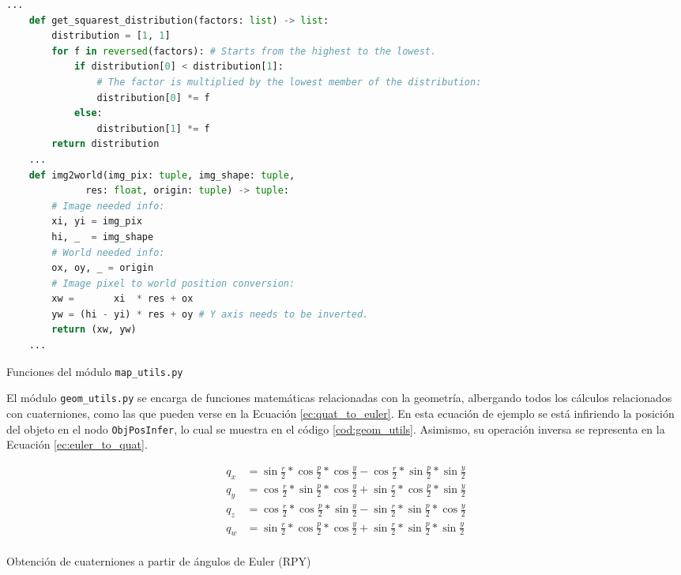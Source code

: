 \begin{code}[h!]
  \begin{lstlisting}[language=Python]
    ...
    def get_squarest_distribution(factors: list) -> list:
        distribution = [1, 1]
        for f in reversed(factors): # Starts from the highest to the lowest.
            if distribution[0] < distribution[1]:
                # The factor is multiplied by the lowest member of the distribution:
                distribution[0] *= f
            else:
                distribution[1] *= f
        return distribution
    ...
    def img2world(img_pix: tuple, img_shape: tuple,
              res: float, origin: tuple) -> tuple:
        # Image needed info:
        xi, yi = img_pix
        hi, _  = img_shape
        # World needed info:
        ox, oy, _ = origin
        # Image pixel to world position conversion:
        xw =       xi  * res + ox
        yw = (hi - yi) * res + oy # Y axis needs to be inverted.
        return (xw, yw)
    ...
  \end{lstlisting}
\caption[Funciones del módulo \texttt{map\_utils.py}]{Funciones del módulo \texttt{map\_utils.py}}
\label{cod:map_utils}
\end{code}

El módulo \texttt{geom\_utils.py} se encarga de funciones matemáticas
relacionadas con la geometría, albergando todos los cálculos relacionados con
cuaterniones, como las que pueden verse en la Ecuación \ref{ec:quat_to_euler}.
En esta ecuación de ejemplo se está infiriendo la posición del objeto en el nodo
\verb|ObjPosInfer|, lo cual se muestra en el código \ref{cod:geom_utils}.
Asimismo, su operación inversa se representa en la Ecuación
\ref{ec:euler_to_quat}.
\\

\begin{myequation}[h!]
  \begin{equation}
  \begin{aligned}
  q_x &= \sin{\frac{r}{2}} * \cos{\frac{p}{2}} * \cos{\frac{y}{2}} - \cos{\frac{r}{2}} * \sin{\frac{p}{2}} * \sin{\frac{y}{2}}  \\
  q_y &= \cos{\frac{r}{2}} * \sin{\frac{p}{2}} * \cos{\frac{y}{2}} + \sin{\frac{r}{2}} * \cos{\frac{p}{2}} * \sin{\frac{y}{2}}  \\
  q_z &= \cos{\frac{r}{2}} * \cos{\frac{p}{2}} * \sin{\frac{y}{2}} - \sin{\frac{r}{2}} * \sin{\frac{p}{2}} * \cos{\frac{y}{2}}  \\
  q_w &= \sin{\frac{r}{2}} * \cos{\frac{p}{2}} * \cos{\frac{y}{2}} + \sin{\frac{r}{2}} * \sin{\frac{p}{2}} * \sin{\frac{y}{2}}  \\
  \end{aligned}
  \label{ec:quat_to_euler}
  \end{equation}
  \caption[Obtención de cuaterniones a partir de ángulos de Euler (RPY)]{Obtención de cuaterniones a partir de ángulos de Euler (RPY)}
\end{myequation}

